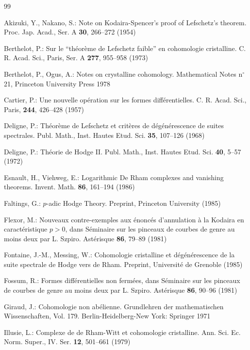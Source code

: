 \documentclass[12pt,a4paper]{article}
\theoremstyle{plain}
\theoremstyle{definition}
\theoremstyle{remark}
\begin{document}
\begin{thebibliography}{99}

 Akizuki, Y., Nakano, S.: Note on Kodaira-Spencer's proof of Lefschetz's theorem. Proc. Jap. Acad., Ser. A \textbf{30}, 266--272 (1954)

 Berthelot, P.: Sur le ``th\'eor\`eme de Lefschetz faible'' en cohomologie cristalline. C. R. Acad. Sci., Paris, Ser. A \textbf{277}, 955--958 (1973)

 Berthelot, P., Ogus, A.: Notes on crystalline cohomology. Mathematical Notes n$^\circ$ 21, Princeton University Press 1978

 Cartier, P.: Une nouvelle op\'eration sur les formes diff\'erentielles. C. R. Acad. Sci., Paris, \textbf{244}, 426--428 (1957)

 Deligne, P.: Th\'eor\`eme de Lefschetz et crit\`eres de d\'eg\'en\'erescence de suites spectrales. Publ. Math., Inst. Hautes Etud. Sci. \textbf{35}, 107--126 (1968)

 Deligne, P.: Th\'eorie de Hodge II. Publ. Math., Inst. Hautes Etud. Sci. \textbf{40}, 5--57 (1972)

 Esnault, H., Viehweg, E.: Logarithmic De Rham complexes and vanishing theorems. Invent. Math. \textbf{86}, 161--194 (1986)

 Faltings, G.: $p$-adic Hodge Theory. Preprint, Princeton University (1985)

 Flexor, M.: Nouveaux contre-exemples aux \'enonc\'es d'annulation \`a la Kodaira en caract\'eristique $p > 0$, dans S\'eminaire sur les pinceaux de courbes de genre au moins deux par L. Szpiro. Ast\'erisque \textbf{86}, 79--89 (1981)

 Fontaine, J.-M., Messing, W.: Cohomologie cristalline et d\'eg\'en\'erescence de la suite spectrale de Hodge vers de Rham. Preprint, Universit\'e de Grenoble (1985)

 Fossum, R.: Formes diff\'erentielles non ferm\'ees, dans S\'eminaire sur les pinceaux de courbes de genre au moins deux par L. Szpiro. Ast\'erisque \textbf{86}, 90--96 (1981)

 Giraud, J.: Cohomologie non ab\'elienne. Grundlehren der mathematischen Wissenschaften, Vol. 179. Berlin-Heidelberg-New York: Springer 1971

 Illusie, L.: Complexe de de Rham-Witt et cohomologie cristalline. Ann. Sci. Ec. Norm. Super., IV. Ser. \textbf{12}, 501--661 (1979)


\end{thebibliography}
\end{document}
